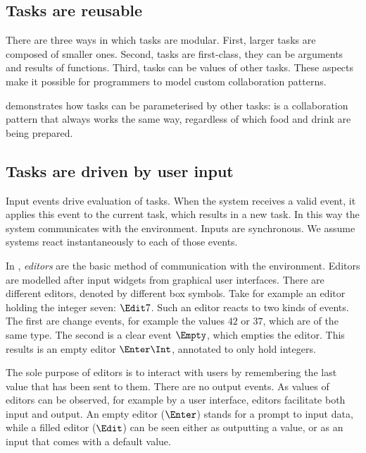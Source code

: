 \subsection{Tasks are reusable}

There are three ways in which tasks are modular.
First, larger tasks are composed of smaller ones.
Second, tasks are first-class, they can be arguments and results of functions.
Third, tasks can be values of other tasks.
These aspects make it possible for programmers to model custom collaboration patterns.

 demonstrates how tasks can be parameterised by other tasks:  is a collaboration pattern that always works the same way, regardless of which food and drink are being prepared.



\subsection{Tasks are driven by user input}

Input events drive evaluation of tasks.
When the system receives a valid event, it applies this event to the current task, which results in a new task.
In this way the system communicates with the environment.
Inputs are synchronous.
We assume systems react instantaneously to each of those events.

In \TOPHAT, \emph{editors} are the basic method of communication with the environment.
Editors are modelled after input widgets from graphical user interfaces.
There are different editors, denoted by different box symbols.
Take for example an editor holding the integer seven: $\Edit 7$.
Such an editor reacts to two kinds of events.
The first are change events, for example the values $42$ or $37$, which are of the same type.
The second is a clear event $\Empty$, which empties the editor.
This results is an empty editor $\Enter \Int$, annotated to only hold integers.


The sole purpose of editors is to interact with users by remembering the last value that has been sent to them.
There are no output events.
As values of editors can be observed, for example by a user interface, editors facilitate both input and output.
An empty editor ($\Enter$) stands for a prompt to input data,
while a filled editor ($\Edit$) can be seen either as outputting a value, or as an input that comes with a default value.



